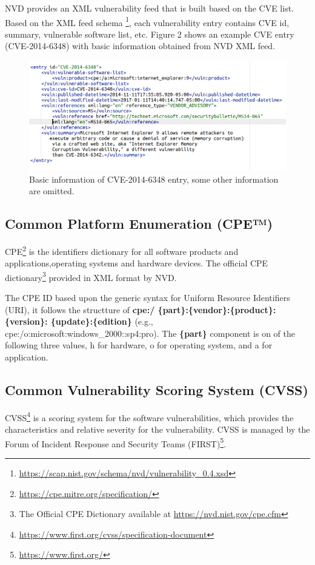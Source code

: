 \documentclass{llncs}
\begin{document}
 \newpage
 NVD provides an XML vulnerability feed that is built based on the CVE list. Based on the XML feed schema \footnote{\url{https://scap.nist.gov/schema/nvd/vulnerability_0.4.xsd}}, each vulnerability entry contains CVE id, summary, vulnerable software list, etc. Figure 2 shows an example CVE entry (CVE-2014-6348) with basic information obtained from NVD XML feed.
  
  \begin{figure}
    \centering
      \includegraphics[width=\textwidth]{cve.png}
       \caption{Basic information of CVE-2014-6348 entry, some other information are omitted. }
  \end{figure}
 
 \subsection{Common Platform Enumeration (CPE™)}
 CPE\footnote{\url{https://cpe.mitre.org/specification/}} is the identifiers dictionary for all software products and applications,operating systems and hardware devices. The official CPE dictionary\footnote{The Official CPE Dictionary available at \url{https://nvd.nist.gov/cpe.cfm}} provided in XML format by NVD.
 \par The CPE ID based upon the generic syntax for Uniform Resource Identifiers (URI), it follows the structture of \textbf{cpe:/ \{part\}:\{vendor\}:\{product\}:\{version\}:
 \{update\}:\{edition\}} (e.g., cpe:/o:microsoft:windows\_2000::sp4:pro). The \textbf{\{part\}} component is on of the following three values, h for hardware, o for operating system, and a for application. 
  
  
 \subsection{Common Vulnerability Scoring System (CVSS)}
 
 \par CVSS\footnote{\url{https://www.first.org/cvss/specification-document}} is a scoring system for the software  vulnerabilities, which provides the characteristics and relative severity for the vulnerability. CVSS is managed by the Forum of Incident Response and Security Teams (FIRST)\footnote{\url{https://www.first.org/}}.
 
\end{document}
